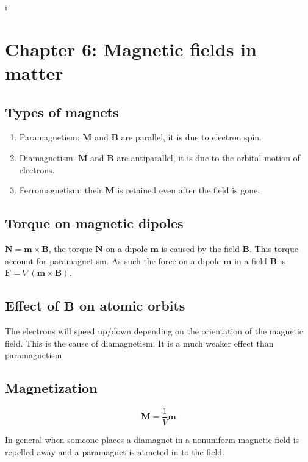 i\documentclass[a4paper]{article}
\begin{document}
\section{Chapter 6: Magnetic fields in matter}

\subsection{Types of magnets}

\begin{enumerate}
    \item Paramagnetism: $\bm{M}$ and $\bm{B}$ are parallel, it is due to electron spin.
    \item Diamagnetism: $\bm{M}$ and $\bm{B}$ are antiparallel, it is due to the orbital motion of electrons.
    \item Ferromagnetism: their $\bm{M}$ is retained even after the field is gone.
\end{enumerate}

\subsection{Torque on magnetic dipoles}

$\bm{N}=\bm{m}\times\bm{B}$, the torque $\bm{N}$ on a dipole $\bm{m}$ is caused by the field $\bm{B}$. This torque account for paramagnetism. As such the force on a dipole $\bm{m}$ in a field $\bm{B}$ is $\bm{F}=\nabla (\bm{m}\times\bm{B})$.

\subsection{Effect of $\bm{B}$ on atomic orbits}

The electrons will speed up/down depending on the orientation of the magnetic field. This is the cause of diamagnetism. It is a much weaker effect than paramagnetism.

\subsection{Magnetization}

\begin{equation}
    \bm{M}=\frac{1}{V}\bm{m}
\end{equation}

In general when someone places a diamagnet in a nonuniform magnetic field is repelled away and a paramagnet is atracted in to the field. 
\end{document}
